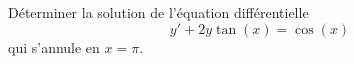 \begin{exercice}\label{exoTP40002}

	Déterminer la solution de l'équation différentielle
	\begin{equation}
		y'+2y\tan(x)=\cos(x)
	\end{equation}
	qui s'annule en $x=\pi$.

\end{exercice}

